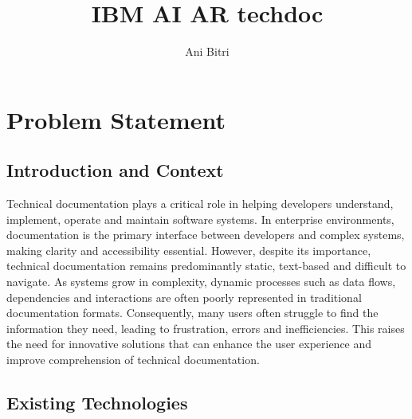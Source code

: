 \documentclass[12pt]{article}
\title{IBM AI AR techdoc}
\author{Ani Bitri}
\begin{document}

\maketitle

\tableofcontents
\newpage

\section{Problem Statement}

    \subsection{Introduction and Context}

        Technical documentation plays a critical role in helping developers understand, implement, operate and maintain software systems. In enterprise environments, documentation is the primary interface between developers and complex
        systems, making clarity and accessibility essential. However, despite its importance, technical documentation remains predominantly static, text-based and difficult to navigate. As systems grow in complexity, dynamic processes such
        as data flows, dependencies and interactions are often poorly represented in traditional documentation formats. Consequently, many users often struggle to find the information they need, leading to frustration, errors and inefficiencies. This 
        raises the need for innovative solutions that can enhance the user experience and improve comprehension of technical documentation.

    \subsection{Existing Technologies}
\end{document}

